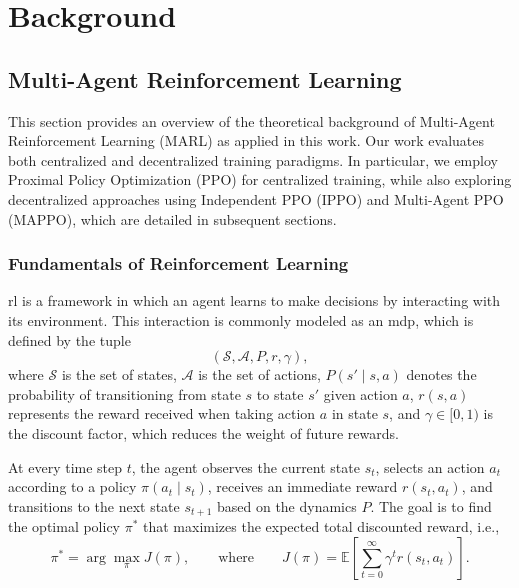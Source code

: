 \chapter{Background}

\section{Multi-Agent Reinforcement Learning}

This section provides an overview of the theoretical background of Multi-Agent Reinforcement Learning (MARL) as applied in this work. Our work evaluates both centralized and decentralized training paradigms. In particular, we employ Proximal Policy Optimization (PPO) for centralized training, while also exploring decentralized approaches using Independent PPO (IPPO) and Multi-Agent PPO (MAPPO), which are detailed in subsequent sections.

\subsection{Fundamentals of Reinforcement Learning}

\gls{rl} is a framework in which an agent learns to make decisions by interacting with its environment. This interaction is commonly modeled as an \gls{mdp}, which is defined by the tuple
\[
(\mathcal{S}, \mathcal{A}, P, r, \gamma),
\]
where \(\mathcal{S}\) is the set of states, \(\mathcal{A}\) is the set of actions, \(P(s'\mid s,a)\) denotes the probability of transitioning from state \(s\) to state \(s'\) given action \(a\), \(r(s,a)\) represents the reward received when taking action \(a\) in state \(s\), and \(\gamma \in [0,1)\) is the discount factor, which reduces the weight of future rewards.

At every time step \(t\), the agent observes the current state \(s_t\), selects an action \(a_t\) according to a policy \(\pi(a_t\mid s_t)\), receives an immediate reward \(r(s_t,a_t)\), and transitions to the next state \(s_{t+1}\) based on the dynamics \(P\). The goal is to find the optimal policy \(\pi^*\) that maximizes the expected total discounted reward, i.e.,
\[
\pi^* = \arg\max_{\pi} J(\pi), \qquad\text{where}\qquad J(\pi) = \mathbb{E}\left[\sum_{t=0}^{\infty} \gamma^t r(s_t, a_t)\right].
\]

